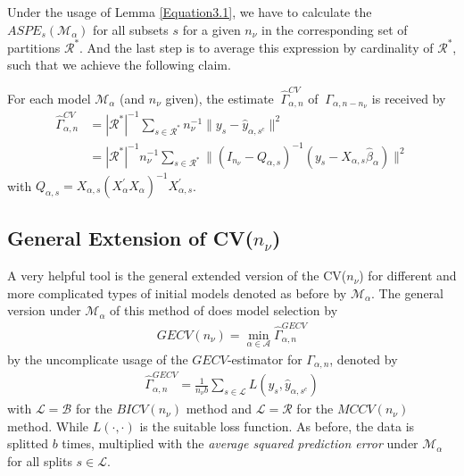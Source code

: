 \documentclass[Research_Module_ES.tex]{subfiles}
\begin{document}
Under the usage of Lemma \ref{Equation3.1}, we have to calculate the $ASPE_{s}(\mathcal{M}_\alpha)$ for all subsets $s$  for a given $n_\nu$ in the corresponding set of partitions $\mathcal{R}^\ast$. And the last step is to average this expression by cardinality of $\mathcal{R}^\ast$, such that we achieve the following claim.

\begin{claim}
	For each model $\mathcal{M}_\alpha$ (and $n_\nu$ given), the estimate $~\hat{\Gamma}_{\alpha,n}^{CV}$ of $~\Gamma_{\alpha,n-n_\nu}$ is received by
	\begin{align*}
		\hat{\Gamma}_{\alpha,n}^{CV}&=|\mathcal{R}^\ast|^{-1}\sum_{s\in \mathcal{R}^\ast}n_\nu^{-1}\parallel y_s-\hat{y}_{\alpha,s^c}\parallel^2\\
		&=|\mathcal{R}^\ast|^{-1}n_\nu^{-1}\sum_{s\in \mathcal{R}^\ast}\parallel (I_{n_\nu}-Q_{\alpha,s})^{-1}(y_s-X_{\alpha,s}\hat{\beta}_\alpha)\parallel^2
	\end{align*}	
	with $Q_{\alpha,s}=X_{\alpha,s}(X_\alpha^\prime X_\alpha)^{-1}X_{\alpha,s}^\prime$.
\end{claim}


	







\subsection{General Extension of CV($n_\nu$)}
A very helpful tool is the general extended version of the CV($n_\nu$) for different and more complicated types of initial models denoted as before by $\mathcal{M}_\alpha$. The general version under $\mathcal{M}_\alpha$ of this method of \cite{shao} does model selection by 
\begin{align*}
	GECV(n_\nu)=\min_{\alpha\in\mathcal{A}}\hat{\Gamma}_{\alpha,n}^{GECV}
\end{align*}
by the uncomplicate usage of the $GECV$-estimator for $\Gamma_{\alpha,n}$, denoted by
\begin{align*}
	\hat{\Gamma}_{\alpha,n}^{GECV}=\frac{1}{n_\nu b}\sum_{s\in\mathcal{L}}L(y_s,\hat{y}_{\alpha,s^c})
\end{align*} 
with $\mathcal{L}=\mathcal{B}$ for the $BICV(n_\nu)$ method and $\mathcal{L}=\mathcal{R}$ for the $MCCV(n_\nu)$ method. While $L(\cdot,\cdot)$ is the suitable loss function. As before, the data is splitted $b$ times, multiplied with the \textit{average squared prediction error} under $\mathcal{M}_\alpha$ for all splits $s\in\mathcal{L}$.
\end{document}
